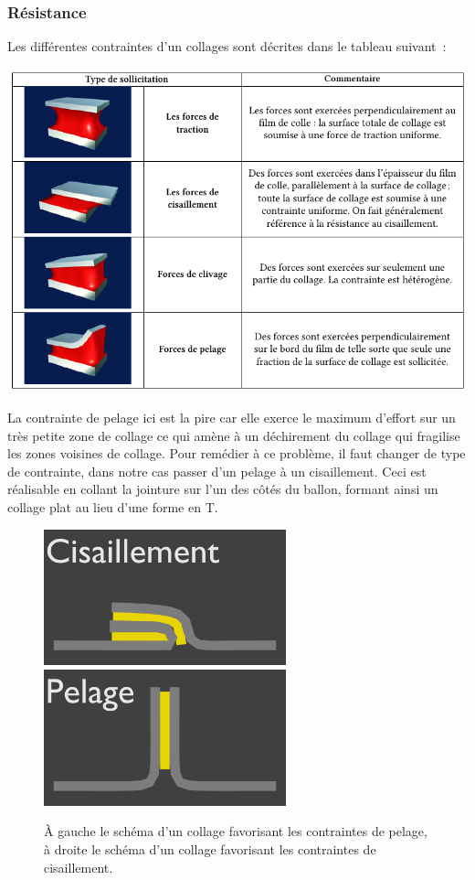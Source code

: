 \documentclass[a4paper,11pt]{article}
\begin{document}
\subsubsection{Résistance}

Les différentes contraintes d'un collages sont décrites dans le tableau suivant~:
\begin{center}
 \includegraphics[width=15cm]{../Images/colle_contraintes.png}
\end{center}

La contrainte de pelage ici est la pire car elle exerce le maximum d'effort sur un très petite zone de collage ce qui amène à un déchirement du collage qui fragilise les zones voisines de collage. Pour remédier à ce problème, il faut changer de type de contrainte, dans notre cas passer d'un pelage à un cisaillement. Ceci est réalisable en collant la jointure sur l'un des côtés du ballon, formant ainsi un collage plat au lieu d'une forme en T.

\begin{figure}[H]
	\centering
 \includegraphics[width=7cm]{../Images/colle_cisaillement.png}
 \includegraphics[width=7cm]{../Images/colle_pelage.png}
 \caption{À gauche le schéma d'un collage favorisant les contraintes de pelage, à droite le schéma d'un collage favorisant les contraintes de cisaillement.}
\end{figure}
\end{document}
